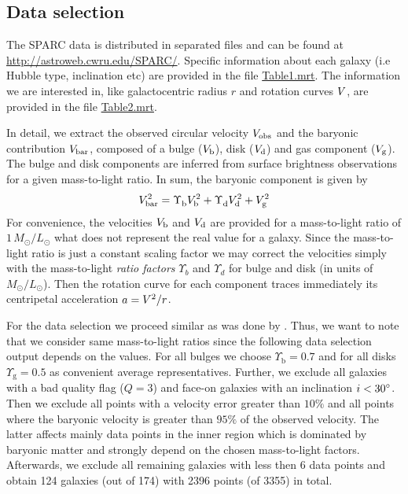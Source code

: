 \subsection{Data selection}
\label{sec:data}
The SPARC data is distributed in separated files and can be found at \url{http://astroweb.cwru.edu/SPARC/}. Specific information about each galaxy (i.e Hubble type, inclination etc) are provided in the file \href{http://astroweb.cwru.edu/SPARC/Table1.mrt}{Table1.mrt}. The information we are interested in, like galactocentric radius $r$ and rotation curves $V$, are provided in the file \href{http://astroweb.cwru.edu/SPARC/Table2.mrt}{Table2.mrt}.

In detail, we extract the observed circular velocity $V_\mathrm{obs}$ and the baryonic contribution $V_\mathrm{bar}$, composed of a bulge ($V_\mathrm{b}$), disk ($V_\mathrm{d}$) and gas component ($V_\mathrm{g}$). The bulge and disk components are inferred from surface brightness observations for a given mass-to-light ratio. In sum, the baryonic component is given by \begin{equation}
	\label{eqn:baryonic-sum}
	\SYMvbar^2 = \Upsilon_\mathrm{b}^{\phantom{2}} \SYMvbulge^2 + \Upsilon_\mathrm{d}^{\phantom{2}} \SYMvdisk^2 + \SYMvgas^2
\end{equation} For convenience, the velocities $V_\mathrm{b}$ and $V_\mathrm{d}$ are provided for a mass-to-light ratio of $1\,M_\odot/L_\odot$ what does not represent the real value for a galaxy. Since the mass-to-light ratio is just a constant scaling factor we may correct the velocities simply with the mass-to-light \textit{ratio factors} $\Upsilon_b$ and $\Upsilon_d$ for bulge and disk (in units of $M_\odot/L_\odot$). Then the rotation curve for each component traces immediately its centripetal acceleration $a = V^2/r$.

For the data selection we proceed similar as was done by \citet{2016arXiv160905917M}. Thus, we want to note that we consider same mass-to-light ratios since the following data selection output depends on the values. For all bulges we choose $\Upsilon_\mathrm{b} = 0.7$ and for all disks $\Upsilon_\mathrm{g} = 0.5$ as convenient average representatives. Further, we exclude all galaxies with a bad quality flag ($Q=3$) and face-on galaxies with an inclination $i<30\mbox{$^\circ$}$. Then we exclude all points with a velocity error greater than $10\%$ and all points where the baryonic velocity is greater than $95\%$ of the observed velocity. The latter affects mainly data points in the inner region which is dominated by baryonic matter and strongly depend on the chosen mass-to-light factors. Afterwards, we exclude all remaining galaxies with less then 6 data points and obtain 124 galaxies (out of 174) with 2396 points (of 3355) in total.